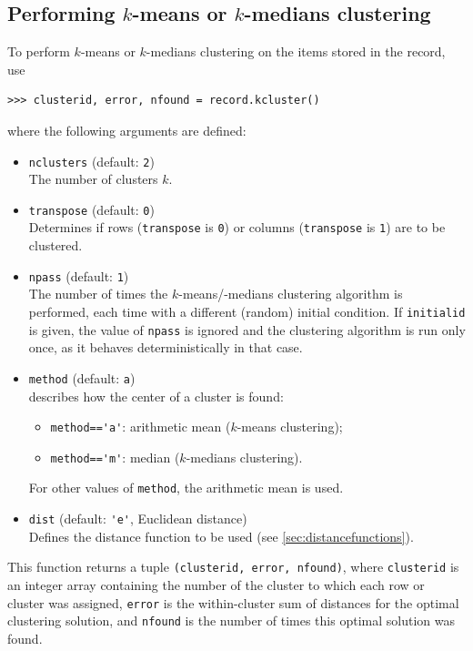 \documentclass{report}
\begin{document}
\subsection*{Performing $k$-means or $k$-medians clustering}

To perform $k$-means or $k$-medians clustering on the items stored in the record, use
\begin{verbatim}
>>> clusterid, error, nfound = record.kcluster()
\end{verbatim}
where the following arguments are defined:
\begin{itemize}
\item \verb|nclusters| (default: \verb|2|) \\
The number of clusters $k$.
\item \verb|transpose| (default: \verb|0|) \\
Determines if rows (\verb|transpose| is \verb|0|) or columns (\verb|transpose| is \verb|1|) are to be clustered.
\item \verb|npass| (default: \verb|1|) \\
The number of times the $k$-means/-medians clustering algorithm is performed, each time with a different (random) initial condition. If \verb|initialid| is given, the value of \verb|npass| is ignored and the clustering algorithm is run only once, as it behaves deterministically in that case.
\item \verb|method| (default: \verb|a|) \\
describes how the center of a cluster is found:
\begin{itemize}
\item \verb|method=='a'|: arithmetic mean ($k$-means clustering);
\item \verb|method=='m'|: median ($k$-medians clustering).
\end{itemize}
For other values of \verb|method|, the arithmetic mean is used.
\item \verb|dist| (default: \verb|'e'|, Euclidean distance) \\
Defines the distance function to be used (see \ref{sec:distancefunctions}).
\end{itemize}

This function returns a tuple \verb|(clusterid, error, nfound)|, where \verb|clusterid| is an integer array containing the number of the cluster to which each row or cluster was assigned, \verb|error| is the within-cluster sum of distances for the optimal clustering solution, and \verb|nfound| is the number of times this optimal solution was found.
\end{document}
